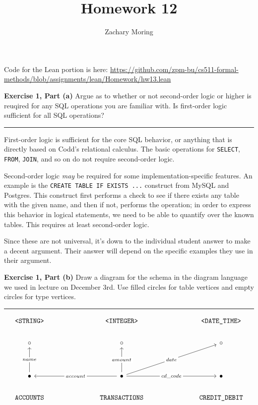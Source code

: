 \documentclass{article}
\title{Homework 12}
\author{Zachary Moring}
\newcommand{\Break}{\vspace{0.2cm}\hrule{}\vspace{0.2cm}}
\begin{document}
 \maketitle

Code for the Lean portion is here:
\url{https://github.com/zpm-bu/cs511-formal-methods/blob/assignments/lean/Homework/hw13.lean}

\vspace{2cm}

\noindent\textbf{Exercise 1, Part (a)} Argue as to whether or not second-order
logic or higher is reuqired for any SQL operations you are familiar with. Is
first-order logic sufficient for all SQL operations?

\Break{}

First-order logic is sufficient for the core SQL behavior, or anything that is
directly based on Codd's relational calculus. The basic operations for
\texttt{SELECT}, \texttt{FROM}, \texttt{JOIN}, and so on do not require
second-order logic.

Second-order logic \textit{may} be required for some implementation-specific
features. An example is the \texttt{CREATE TABLE IF EXISTS ...} construct from
MySQL and Postgres. This construct first performs a check to see if there
exists any table with the given name, and then if not, performs the operation;
in order to express this behavior in logical statements, we need to be able to
quantify over the known tables. This requires at least second-order logic.

Since these are not universal, it's down to the individual student answer to
make a decent argument. Their answer will depend on the specific examples they
use in their argument.

\newpage{}

\noindent\textbf{Exercise 1, Part (b)} Draw a diagram for the schema in the
diagram language we used in lecture on December 3rd. Use filled circles for
table vertices and empty circles for type vertices.

\Break{}

\[\begin{tikzcd}
	{\texttt{<STRING>}} &&& {\texttt{<INTEGER>}} &&& {\texttt{<DATE\_TIME>}} \\
	\circ &&& \circ &&& \circ \\
	\\
	\bullet &&& \bullet &&& \bullet \\
	{\texttt{ACCOUNTS}} &&& {\texttt{TRANSACTIONS}} &&& {\texttt{CREDIT\_DEBIT}}
	\arrow["name"{description}, from=4-1, to=2-1]
	\arrow["amount"{description}, from=4-4, to=2-4]
	\arrow["date"{description}, from=4-4, to=2-7]
	\arrow["account"{description}, from=4-4, to=4-1]
	\arrow["{cd\_code}"{description}, from=4-4, to=4-7]
\end{tikzcd}\]
\end{document}
